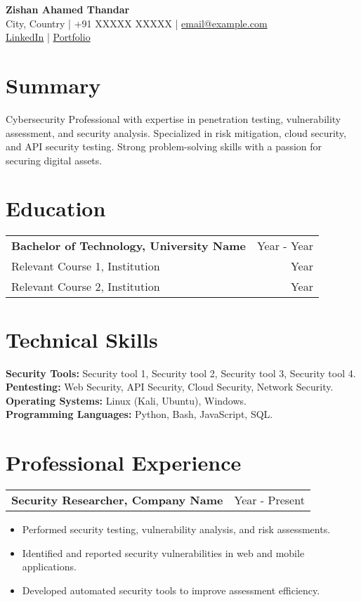 \documentclass[a4paper,10pt]{article}
\begin{document}
\pagestyle{empty}

\begin{center}
    {\LARGE\textbf{Zishan Ahamed Thandar}}\\
    City, Country | +91 XXXXX XXXXX | \href{mailto:email@example.com}{email@example.com}\\
    \href{https://linkedin.com/in/username}{LinkedIn} | \href{https://portfolio.example.com}{Portfolio}
\end{center}

\section*{Summary}
Cybersecurity Professional with expertise in penetration testing, vulnerability assessment, and security analysis. Specialized in risk mitigation, cloud security, and API security testing. Strong problem-solving skills with a passion for securing digital assets.

\section*{Education}
\begin{tabularx}{\linewidth}{X r}
    \textbf{Bachelor of Technology, University Name} & Year - Year \\
    Relevant Course 1, Institution & Year \\
    Relevant Course 2, Institution & Year 
\end{tabularx}

\section*{Technical Skills}
\textbf{Security Tools:} Security tool 1, Security tool 2, Security tool 3, Security tool 4.\\
\textbf{Pentesting:} Web Security, API Security, Cloud Security, Network Security.\\
\textbf{Operating Systems:} Linux (Kali, Ubuntu), Windows.\\
\textbf{Programming Languages:} Python, Bash, JavaScript, SQL.

\section*{Professional Experience}
\begin{tabularx}{\linewidth}{X r}
    \textbf{Security Researcher, Company Name} & Year - Present \\
\end{tabularx}
\begin{itemize}
    \item Performed security testing, vulnerability analysis, and risk assessments.
    \item Identified and reported security vulnerabilities in web and mobile applications.
    \item Developed automated security tools to improve assessment efficiency.
\end{itemize}
\end{document}
